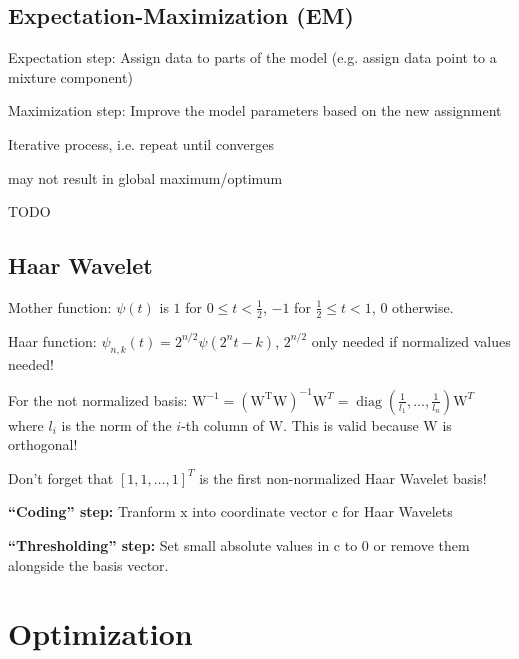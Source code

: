 \documentclass[a4paper, 11pt, landscape]{article}
\newcommand{\matr}[1]{\boldsymbol{\mathrm{#1}}}
\begin{document}
\begin{multicols*}{3}
\subsection{Expectation-Maximization (EM)}
\begin{compactitem}
	\item Expectation step: Assign data to parts of the model (e.g. assign data point to a mixture component)
	\item Maximization step: Improve the model parameters based on the new assignment
	\item Iterative process, i.e. repeat until converges
	\item may not result in global maximum/optimum
	\item TODO
\end{compactitem}

\subsection{Haar Wavelet}
\begin{compactdesc}
	\item[Mother function:] $\psi(t)$ is $1$ for $0 \leq t < \frac{1}{2}$, $-1$ for $\frac{1}{2} \leq t < 1$, $0$ otherwise.
	\item[Haar function:] $\psi_{n,k}(t) = 2^{n/2} \psi(2^n t - k)$, $2^{n/2}$ only needed if normalized values needed!
\end{compactdesc}

\begin{compactitem}
	\item For the not normalized basis: $\matr{W}^{-1} = (\matr{W^T} \matr{W})^{-1} \matr{W}^T = \operatorname{diag}(\frac{1}{l_1}, \ldots, \frac{1}{l_n}) \matr{W}^T$ where $l_i$ is the norm of the $i$-th column of $\matr{W}$. This is valid because $\matr{W}$ is orthogonal!
	\item Don't forget that $[1, 1, \ldots, 1]^T$ is the first non-normalized Haar Wavelet basis!
	\item \textbf{``Coding'' step:} Tranform $\matr{x}$ into coordinate vector $\matr{c}$ for Haar Wavelets
	\item \textbf{``Thresholding'' step:} Set small absolute values in $\matr{c}$ to $0$ or remove them alongside the basis vector.
\end{compactitem}

\section{Optimization}

\end{multicols*}
\end{document}
